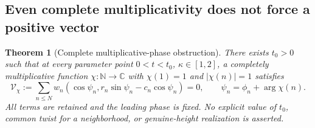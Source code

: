 \documentclass[11pt]{article}
\numberwithin{equation}{section}
\newtheorem{theorem}{Theorem}[section]
\theoremstyle{definition}
\theoremstyle{remark}
\begin{document}
\subsection{Even complete multiplicativity does not force a positive vector}
\begin{theorem}[Complete multiplicative-phase obstruction]
\label{sc:character}
There exists $t_0>0$ such that at every parameter point
$0<t<t_0$, $\kappa\in[1,2]$, a completely multiplicative function
$\chi:\mathbb N\to\mathbb C$ with $\chi(1)=1$ and $|\chi(n)|=1$
satisfies
\begin{equation}\label{sc:characterzero}
 \mathcal V_\chi:=\sum_{n\le N}w_n
  (\cos\psi_n,r_n\sin\psi_n-c_n\cos\psi_n)=0,
 \qquad\psi_n=\phi_n+\arg\chi(n).
\end{equation}
All terms are retained and the leading phase is fixed. No explicit value
of $t_0$, common twist for a neighborhood, or genuine-height realization
is asserted.
\end{theorem}
\end{document}

